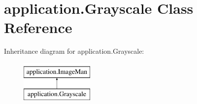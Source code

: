 \hypertarget{classapplication_1_1_grayscale}{}\section{application.\+Grayscale Class Reference}
\label{classapplication_1_1_grayscale}
Inheritance diagram for application.\+Grayscale\+:\begin{figure}[H]
\begin{center}
\leavevmode
\includegraphics[height=2.000000cm]{classapplication_1_1_grayscale}
\end{center}
\end{figure}
